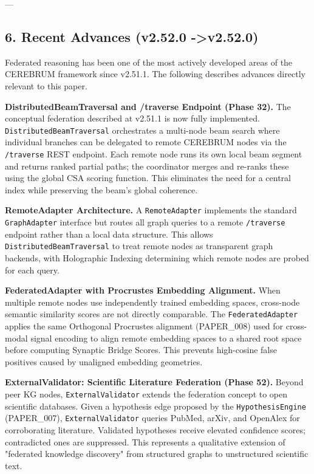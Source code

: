 ---

\subsection{6. Recent Advances (v2.52.0 -\textgreater  v2.52.0)}

Federated reasoning has been one of the most actively developed areas of the CEREBRUM framework since v2.51.1. The following describes advances directly relevant to this paper.

\textbf{Distri\-butedBeamTraversal and /traverse Endpoint (Phase 32).} The conceptual federation described at v2.51.1 is now fully implemented. \texttt{DistributedBeamTraversal} orche\-strates a multi-node beam search where individual branches can be delegated to remote CEREBRUM nodes via the \texttt{/traverse} REST endpoint. Each remote node runs its own local beam segment and returns ranked partial paths; the coordinator merges and re-ranks these using the global CSA scoring function. This eliminates the need for a central index while preserving the beam's global coherence.

\textbf{RemoteAdapter Archit\-ecture.} A \texttt{RemoteAdapter} implements the standard \texttt{GraphAdapter} interface but routes all graph queries to a remote \texttt{/traverse} endpoint rather than a local data structure. This allows \texttt{DistributedBeamTraversal} to treat remote nodes as transparent graph backends, with Holographic Indexing determining which remote nodes are probed for each query.

\textbf{FederatedAdapter with Procrustes Embedding Alignment.} When multiple remote nodes use indep\-endently trained embedding spaces, cross-node semantic similarity scores are not directly comparable. The \texttt{FederatedAdapter} applies the same Orthogonal Procrustes alignment (PAPER\_008) used for cross-modal signal encoding to align remote embedding spaces to a shared root space before computing Synaptic Bridge Scores. This prevents high-cosine false positives caused by unaligned embedding geometries.

\textbf{ExternalValidator: Scientific Literature Federation (Phase 52).} Beyond peer KG nodes, \texttt{ExternalValidator} extends the federation concept to open scientific databases. Given a hypothesis edge proposed by the \texttt{HypothesisEngine} (PAPER\_007), \texttt{ExternalValidator} queries PubMed, arXiv, and OpenAlex for corro\-borating literature. Validated hypotheses receive elevated confidence scores; contr\-adicted ones are suppressed. This represents a qualitative extension of "federated knowledge discovery" from structured graphs to unstr\-uctured scientific text.

